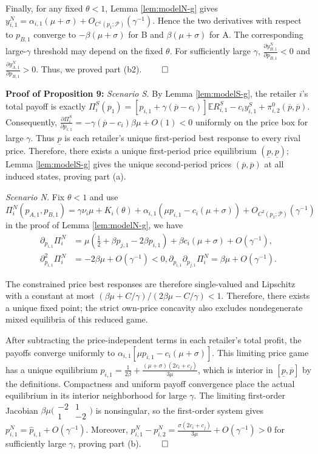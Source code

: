 \documentclass[nonblindrev,copyedit]{informs1}
\begin{document}
\begin{APPENDICES}
Finally, for any fixed $\theta<1$, Lemma \ref{lem:modelN-g} gives $y_{i,1}^N=\alpha_{i,1}(\mu+\sigma)+O_{C^1(p_1;\mathcal{P})}(\gamma^{-1})$. Hence the two derivatives with respect to $p_{B,1}$ converge to $-\beta(\mu+\sigma)$ for B and $\beta(\mu+\sigma)$ for A. The corresponding large-$\gamma$ threshold may depend on the fixed $\theta$. For sufficiently large $\gamma$, $\frac{\partial y_{B,1}^N}{\partial p_{B,1}} < 0$ and $\frac{\partial y_{A,1}^N}{\partial p_{B,1}} > 0$. Thus, we proved part (b2). $\qed$

{\bf Proof of Proposition 9: }
{\it Scenario S. }
By Lemma \ref{lem:modelS-g}, the retailer $i$'s total payoff is exactly $\Pi_i^S(p_1) =[p_{i,1}+\gamma(\overline{p}-c_i)]\mathbb{E} R_{i,1}^S-c_i y_{i,1}^S +\pi_{i,2}^0(\overline{p},\overline{p}).$
Consequently, $\frac{\partial\Pi_i^S}{\partial p_{i,1}} =-\gamma(\overline{p}-c_i)\beta\mu+O(1)<0$ uniformly on the price box for large $\gamma$.
Thus $\underline{p}$ is each retailer's unique first-period best response to every rival price. Therefore, there exists a unique first-period price equilibrium $(\underline{p},\underline{p})$; Lemma \ref{lem:modelS-g} gives the unique second-period prices $(\overline{p},\overline{p})$ at all induced states, proving part (a).

{\it Scenario N. }
Fix $\theta<1$ and use $\Pi_i^N(p_{A,1},p_{B,1}) =\gamma\nu_i\mu+K_i(\theta)+\alpha_{i,1}(\mu p_{i,1}-c_i(\mu + \sigma))+O_{C^2(p_1;\mathcal{P})}(\gamma^{-1})$ in the proof of Lemma \ref{lem:modelN-g}, we have
\begin{eqnarray*}
\partial_{p_{i,1}} \Pi_i^N &=\mu\left(\tfrac12+\beta p_{j,1}-2\beta p_{i,1}\right) +\beta c_i(\mu+\sigma)+O(\gamma^{-1}),\label{eq:p1FOC}\\
\partial^2_{p_{i,1}}\Pi_i^N &=-2\beta\mu+O(\gamma^{-1})<0,
\partial_{p_{i,1}}\partial_{p_{j,1}}\Pi_i^N  =\beta\mu+O(\gamma^{-1}).
\end{eqnarray*}

The constrained price best responses are therefore single-valued and Lipschitz with a constant at most $(\beta\mu+C/\gamma)/(2\beta\mu-C/\gamma)<1$. Therefore, there exists a unique fixed point; the strict own-price concavity also excludes nondegenerate mixed equilibria of this reduced game.

After subtracting the price-independent terms in each retailer's total profit, the payoffs converge uniformly to $\alpha_{i,1}[\mu p_{i,1}-c_i(\mu+\sigma)]$.
This limiting price game has a unique equilibrium $\widehat p_{i,1} = \frac1{2\beta} +\frac{(\mu+\sigma)(2c_i+c_j)}{3\mu}$, which is interior in $[\underline{p},\overline{p}]$ by the definitions. Compactness and uniform payoff convergence place the actual equilibrium in its interior neighborhood for large $\gamma$. The limiting first-order Jacobian $\beta\mu\bigl(\begin{smallmatrix}-2&1\\1&-2\end{smallmatrix}\bigr)$ is nonsingular, so the first-order system gives $p_{i,1}^N=\widehat p_{i,1}+O(\gamma^{-1})$. Moreover, $p^N_{i,1}-p^N_{i,2} =\frac{\sigma(2c_i+c_j)}{3\mu} + O(\gamma^{-1})>0$ for sufficiently large $\gamma$, proving part (b). $\qed$


\end{APPENDICES}
\end{document}
